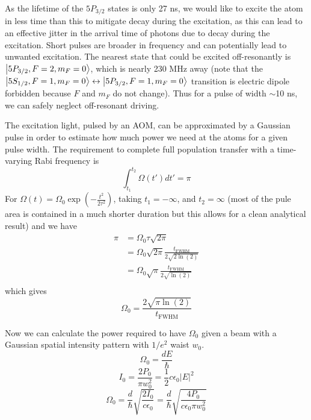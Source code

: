 As the lifetime of the $5P_{3/2}$ states is only 27 ns, we would like to excite the atom in less time than this to mitigate decay during the excitation, as this can lead to an effective jitter in the arrival time of photons due to decay during the excitation. Short pulses are broader in frequency and can potentially lead to unwanted excitation. The nearest state that could be excited off-resonantly is $\ket{5P_{3/2},F=2,m_F=0}$, which is nearly 230 MHz away (note that the $\ket{5S_{1/2},F=1,m_F=0} \leftrightarrow \ket{5P_{3/2},F=1,m_F=0}$ transition is electric dipole forbidden because $F$ and $m_F$ do not change). Thus for a pulse of width $\sim$10 ns, we can safely neglect off-resonant driving.

The excitation light, pulsed by an AOM, can be approximated by a Gaussian pulse in order to estimate how much power we need at the atoms for a given pulse width. The requirement to complete full population transfer with a time-varying Rabi frequency is 
\begin{equation}
\int_{t_1}^{t_2} \Omega(t') dt' =\pi
\end{equation}
For $\Omega(t)=\Omega_0 \exp({-\frac{t^2}{2\tau^2}})$, taking $t_1=-\infty$, and $t_2=\infty$ (most of the pule area is contained in a much shorter duration but this allows for a clean analytical result) and we have
\begin{equation} \label{eq:pi}
\begin{split}
\pi & = \Omega_0 \tau \sqrt{2 \pi} \\
 & = \Omega_0 \sqrt{2 \pi} \frac{t_{\textrm{FWHM}}}{2\sqrt{2\ln(2)}} \\
 & = \Omega_0 \sqrt{\pi} \frac{t_{\textrm{FWHM}}}{2\sqrt{\ln(2)}} \\
\end{split}
\end{equation}
which gives
\begin{equation}
    \Omega_0=\frac{2\sqrt{\pi \ln(2)}}{t_{\textrm{FWHM}}}
\end{equation}


Now we can calculate the power required to have $\Omega_0$ given a beam with a Gaussian spatial intensity pattern with $1/e^2$ waist $w_0$. 
\begin{equation}
    \Omega_0=\frac{dE}{\hbar}
\end{equation}
\begin{equation}
    I_0=\frac{2P_0}{\pi w_0^2}=\frac{1}{2}c \epsilon_0|E|^2
\end{equation}
\begin{equation}
    \Omega_0 =\frac{d}{\hbar}\sqrt{\frac{2I_0}
{c\epsilon_0}}=\frac{d}{\hbar}\sqrt{\frac{4P_0}{c\epsilon_0 \pi w_0^2}}
\end{equation}

